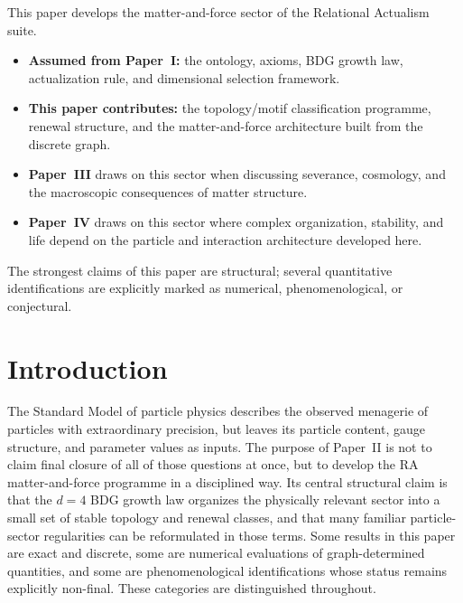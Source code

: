 \documentclass[11pt]{article}
\begin{document}
\begin{tcolorbox}[title=Place of This Paper in the RA Suite,colback=gray!5,colframe=gray!60]
This paper develops the matter-and-force sector of the Relational Actualism suite.
\begin{itemize}[nosep]
    \item \textbf{Assumed from Paper~I:} the ontology, axioms, BDG growth law, actualization rule, and dimensional selection framework.
    \item \textbf{This paper contributes:} the topology/motif classification programme, renewal structure, and the matter-and-force architecture built from the discrete graph.
    \item \textbf{Paper~III} draws on this sector when discussing severance, cosmology, and the macroscopic consequences of matter structure.
    \item \textbf{Paper~IV} draws on this sector where complex organization, stability, and life depend on the particle and interaction architecture developed here.
\end{itemize}
The strongest claims of this paper are structural; several quantitative identifications are explicitly marked as numerical, phenomenological, or conjectural.
\end{tcolorbox}

\section{Introduction}
\label{sec:intro}

The Standard Model of particle physics describes the observed menagerie of particles with extraordinary precision, but leaves its particle content, gauge structure, and parameter values as inputs. The purpose of Paper~II is not to claim final closure of all of those questions at once, but to develop the RA matter-and-force programme in a disciplined way. Its central structural claim is that the $d=4$ BDG growth law organizes the physically relevant sector into a small set of stable topology and renewal classes, and that many familiar particle-sector regularities can be reformulated in those terms. Some results in this paper are exact and discrete, some are numerical evaluations of graph-determined quantities, and some are phenomenological identifications whose status remains explicitly non-final. These categories are distinguished throughout.
\end{document}
